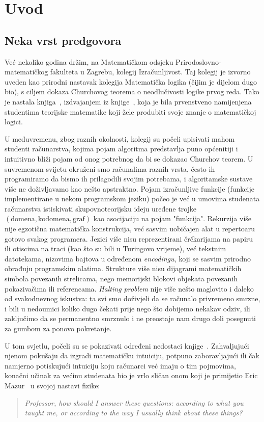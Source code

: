 \chapter{Uvod}

\section{Neka vrst predgovora}

Već nekoliko godina držim, na Matematičkom odsjeku Prirodoslovno-matematičkog fakulteta u Zagrebu, kolegij Izračunljivost. Taj kolegij je izvorno uveden kao prirodni nastavak kolegija Matematička logika (čijim je dijelom dugo bio), s ciljem dokaza Churchovog teorema o neodlučivosti logike prvog reda. Tako je nastala knjiga~\cite{skr:Vuk}, izdvajanjem iz knjige~\cite{skr:VukML}, koja je bila prvenstveno namijenjena studentima teorijske matematike koji žele produbiti svoje znanje o matematičkoj logici.

U međuvremenu, zbog raznih okolnosti, kolegij su počeli upisivati mahom studenti računarstva, kojima pojam algoritma predstavlja puno općenitiji i intuitivno bliži pojam od onog potrebnog da bi se dokazao Churchov teorem. U suvremenom svijetu okruženi smo računalima raznih vrsta, često ih programiramo da bismo ih prilagodili svojim potrebama, i algoritamske sustave više ne doživljavamo kao nešto apstraktno. Pojam izračunljive funkcije (funkcije implementirane u nekom programskom jeziku) počeo je već u umovima studenata računarstva istiskivati skupovnoteorijsku ideju uređene trojke $(\text{domena},\text{kodomena},\text{graf})$ kao asocijaciju na pojam "funkcija". Rekurzija više nije egzotična matematička konstrukcija, već sasvim uobičajen alat u repertoaru gotovo svakog programera. Jezici više nisu reprezentirani črčkarijama na papiru ili otiscima na traci (kao što su bili u Turingovo vrijeme), već tekstnim datotekama, nizovima bajtova u određenom \emph{encodingu}, koji se sasvim prirodno obrađuju programskim alatima. Strukture više nisu dijagrami matematičkih simbola povezanih strelicama, nego memorijski blokovi objekata povezanih pokazivačima ili referencama. \emph{Halting problem} nije više nešto maglovito i daleko od svakodnevnog iskustva: ta svi smo doživjeli da se računalo privremeno smrzne, i bili u nedoumici koliko dugo čekati prije nego što dobijemo nekakav odziv, ili zaključimo da se permanentno smrznulo i ne preostaje nam drugo doli posegnuti za gumbom za ponovo pokretanje. 

U tom svjetlu, počeli su se pokazivati određeni nedostaci knjige~\cite{skr:Vuk}. Zahvaljujući njenom pokušaju da izgradi matematičku intuiciju, potpuno zaboravljajući ili čak namjerno potiskujući intuiciju koju računarci već imaju o tim pojmovima, konačni učinak za većinu studenata bio je vrlo sličan onom koji je primijetio Eric Mazur~\cite{mazur} u svojoj nastavi fizike:
\begin{quote}
    \emph{Professor, how should I answer these questions: according to what you taught me, or according to the way I usually think about these things?}
\end{quote}

